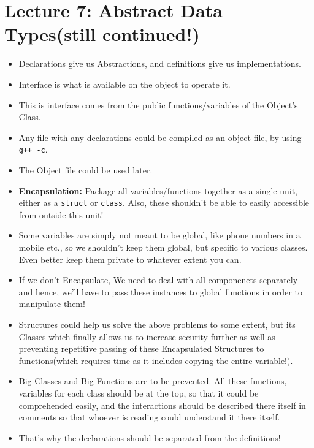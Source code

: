 \documentclass{article}
\begin{document}
\section{Lecture 7: Abstract Data Types(still continued!)}
\begin{itemize}
  \item  Declarations give us Abstractions, and definitions give us implementations.
  \item  Interface is what is available on the object to operate it.
  \item This is interface comes from the public functions/variables of the Object's Class.
  \item Any file with any declarations could be compiled as an object file, by using \verb|g++ -c|.
  \item The Object file could be used later.
  \item \textbf{Encapsulation:} Package all variables/functions together as a single unit, either as a \verb|struct| or \verb|class|. Also, these shouldn't be able to easily accessible from outside this unit!
  \item Some variables are simply not meant to be global, like phone numbers in a mobile etc., so we shouldn't keep them global, but specific to various classes. Even better keep them private to whatever extent you can.
  \item If we don't Encapsulate, We need to deal with all componenets separately and hence, we'll have to pass these instances to global functions in order to manipulate them!
  \item Structures could help us solve the above problems to some extent, but its Classes which finally allows us to increase security further as well as preventing repetitive passing of these Encapsulated Structures to functions(which requires time as it includes copying the entire variable!).
  \item Big Classes and Big Functions are to be prevented. All these functions, variables for each class should be at the top, so that it could be comprehended easily, and the interactions should be described there itself in comments so that whoever is reading could understand it there itself.
  \item That's why the declarations should be separated from the definitions!
\end{itemize}
\end{document}
